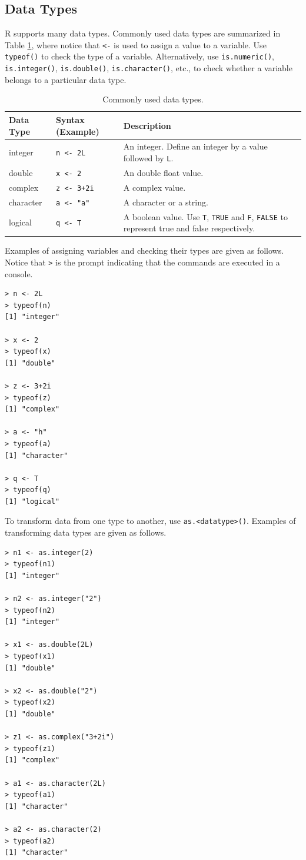 \subsection{Data Types}

R supports many data types. Commonly used data types are summarized in Table \ref{ch:r1:tab:datatype}, where notice that \verb|<-| is used to assign a value to a variable. Use \verb|typeof()| to check the type of a variable. Alternatively, use \verb|is.numeric()|, \verb|is.integer()|, \verb|is.double()|, \verb|is.character()|, etc., to check whether a variable belongs to a particular data type.
\begin{table}
  \centering \caption{Commonly used data types.}\label{ch:r1:tab:datatype}
  \begin{tabularx}{\textwidth}{llX}
    \hline
    Data Type & Syntax (Example) & Description \\ \hline
    integer & \verb|n <- 2L| & An integer. Define an integer by a value followed by \verb|L|. \\
    double & \verb|x <- 2| & An double float value. \\
    complex & \verb|z <- 3+2i| & A complex value. \\
    character & \verb|a <- "a"| & A character or a string. \\
    logical & \verb|q <- T| & A boolean value. Use \verb|T|, \verb|TRUE| and \verb|F|, \verb|FALSE| to represent true and false respectively. \\
    \hline
  \end{tabularx}
\end{table}

Examples of assigning variables and checking their types are given as follows. Notice that \verb|>| is the prompt indicating that the commands are executed in a console.
\begin{lstlisting}
> n <- 2L
> typeof(n)
[1] "integer"

> x <- 2
> typeof(x)
[1] "double"

> z <- 3+2i
> typeof(z)
[1] "complex"

> a <- "h"
> typeof(a)
[1] "character"

> q <- T
> typeof(q)
[1] "logical"
\end{lstlisting}

To transform data from one type to another, use \verb|as.<datatype>()|. Examples of transforming data types are given as follows.
\begin{lstlisting}
> n1 <- as.integer(2)
> typeof(n1)
[1] "integer"

> n2 <- as.integer("2")
> typeof(n2)
[1] "integer"

> x1 <- as.double(2L)
> typeof(x1)
[1] "double"

> x2 <- as.double("2")
> typeof(x2)
[1] "double"

> z1 <- as.complex("3+2i")
> typeof(z1)
[1] "complex"

> a1 <- as.character(2L)
> typeof(a1)
[1] "character"

> a2 <- as.character(2)
> typeof(a2)
[1] "character"
\end{lstlisting}


